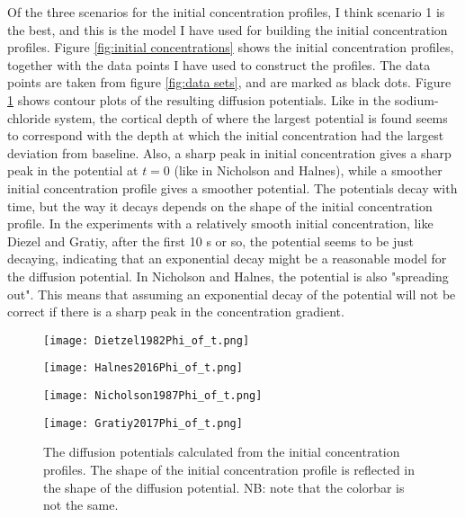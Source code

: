 \documentclass{article}
\begin{document}
Of the three scenarios for the initial concentration profiles, I think scenario 1 is the best, and this is the model I have used for building the initial concentration profiles. Figure \ref{fig:initial concentrations} shows the initial concentration profiles, together with the data points I have used to construct the profiles. The data points are taken from figure \ref{fig:data sets}, and are marked as black dots. Figure \ref{fig:contours} shows contour plots of the resulting diffusion potentials. Like in the sodium-chloride system, the cortical depth of where the largest potential is found seems to correspond with the depth at which the initial concentration had the largest deviation from baseline. Also, a sharp peak in initial concentration gives a sharp peak in the potential at $t=0$ (like in Nicholson and Halnes), while a smoother initial concentration profile gives a smoother potential. The potentials decay with time, but the way it decays depends on the shape of the initial concentration profile. In the experiments with a relatively smooth initial concentration, like Diezel and Gratiy, after the first 10 s or so, the potential seems to be just decaying, indicating that an exponential decay might be a reasonable model for the diffusion potential. In Nicholson and Halnes, the potential is also "spreading out". This means that assuming an exponential decay of the potential will not be correct if there is a sharp peak in the concentration gradient. 

\begin{figure}[!tbp]
  \centering
  \begin{minipage}[b]{0.45\textwidth}
    \texttt{[image: Dietzel1982Phi\_of\_t.png]}
  \end{minipage}
  \hfill
  \begin{minipage}[b]{0.45\textwidth}
    \texttt{[image: Halnes2016Phi\_of\_t.png]}
  \end{minipage}
    \begin{minipage}[b]{0.45\textwidth}
    \texttt{[image: Nicholson1987Phi\_of\_t.png]}
  \end{minipage}
  \hfill
  \begin{minipage}[b]{0.45\textwidth}
    \texttt{[image: Gratiy2017Phi\_of\_t.png]}
  \end{minipage}
  \caption{The diffusion potentials calculated from the initial concentration profiles. The shape of the initial concentration profile is reflected in the shape of the diffusion potential. NB: note that the colorbar is not the same.}
  \label{fig:contours}
\end{figure} 
\end{document}
